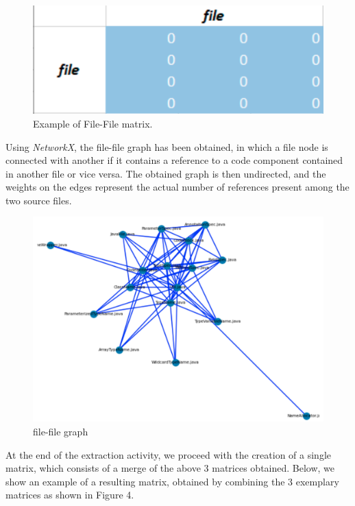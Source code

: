 \documentclass[sigconf]{acmart}
\begin{document}
\begin{figure}[h]
  \centering
  \includegraphics[width=\linewidth]{img_2}
  \caption{Example of File-File  matrix.}
  \Description{}
\end{figure}

Using {\itshape NetworkX}, the file-file graph has been obtained, in which a file node is connected with another if it contains a reference to a code component contained in another file or vice versa. The obtained graph is then undirected, and the weights on the edges represent the actual number of references present among the two source files.

\begin{figure}[h]
  \centering
  \includegraphics[width=\linewidth]{img_10}
  \caption{file-file graph}
  \Description{}
\end{figure}

At the end of the extraction activity, we proceed with the creation of a single matrix, which consists of a merge of the above 3 matrices obtained.
Below, we show an example of a resulting matrix, obtained by combining the 3 exemplary matrices as shown in Figure 4.
\end{document}
